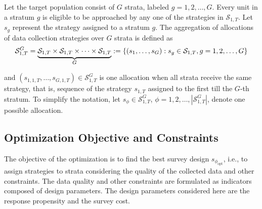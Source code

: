 \documentclass[12pt]{article}
\begin{document}
Let the target population consist of $G$ strata, labeled $g=1,2,\dots,G$.
Every unit in a stratum $g$ is eligible to be approached by any one of the strategies in $\mathcal{S}_{1,T}$.
Let $s_g$ represent the strategy assigned to a stratum $g$.
The aggregation of allocations of data collection strategies over $G$ strata is defined as
\let\saveeqnno\theequation
\let\savefrac\frac
\def\dispfrac{\displaystyle\savefrac}
\begin{eqnarray*}
\let\frac\dispfrac
\gdef\theequation{}
\let\theHequation\theequation
	\mathcal{S}^G_{1,T}=\underbrace{\mathcal{S}_{1,T}\times\mathcal{S}_{1,T}\times\dots\times\mathcal{S}_{1,T}}_G:=\{(s_{1},\dots,s_{G}):s_g \in \mathcal{S}_{1,T}, g=1,2,\dots,G\}
\end{eqnarray*}
\global\let\theequation\saveeqnno
\addtocounter{equation}{-1}\ignorespaces

and $(s_{1,1,T},\dots,s_{G,1,T}) \in \mathcal{S}^G_{1,T}$ is one allocation when all strata receive the same strategy, that is, sequence of the strategy $s_{1,T}$ assigned to the first till the $G$-th stratum.
To simplify the notation, let $s_\phi \in \mathcal{S}^G_{1,T}$, $\phi={1,2,\dots,|\mathcal{S}^G_{1,T}|}$, denote one possible allocation.

\subsection{Optimization Objective and Constraints}
\label{subsec:optimization-objective-constraints}

The objective of the optimization is to find the best survey design $s_{\phi_{\mathrm{opt}}}$, i.e., to assign strategies to strata considering the quality of the collected data and other constraints.
The data quality and other constraints are formulated as indicators composed of design parameters.
The design parameters considered here are the response propensity and the survey cost.
\end{document}
